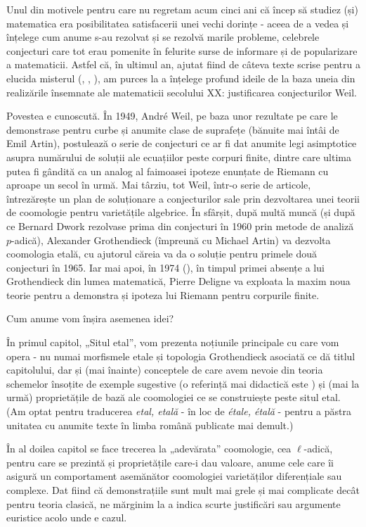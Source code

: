 \documentclass[13pt,openany,oneside]{book}
\begin{document}
Unul din motivele pentru care nu regretam acum cinci ani că încep să studiez (și) matematica era posibilitatea satisfacerii unei vechi dorințe - aceea de a vedea și înțelege cum anume s-au rezolvat și se rezolvă marile probleme, celebrele conjecturi care tot erau pomenite în felurite surse de informare și de popularizare a matematicii. Astfel că, în ultimul an, ajutat fiind de câteva texte scrise pentru a elucida misterul (\cite{milne}, \cite{lovering}, \cite{dugger}), am purces la a înțelege profund ideile de la baza uneia din realizările însemnate ale matematicii secolului XX: justificarea conjecturilor Weil.

Povestea e cunoscută. În 1949, André Weil, pe baza unor rezultate pe care le demonstrase pentru curbe și anumite clase de suprafețe (bănuite mai întâi de Emil Artin), postulează o serie de conjecturi ce ar fi dat anumite legi asimptotice asupra numărului de soluții ale ecuațiilor peste corpuri finite, dintre care ultima putea fi gândită ca un analog al faimoasei ipoteze enunțate de Riemann cu aproape un secol în urmă. Mai târziu, tot Weil, într-o serie de articole, întrezărește un plan de soluționare a conjecturilor sale prin dezvoltarea unei teorii de coomologie pentru varietățile algebrice. În sfârșit, după multă muncă (și după ce Bernard Dwork rezolvase prima din conjecturi în 1960 prin metode de analiză $p$-adică), Alexander Grothendieck (împreună cu Michael Artin) va dezvolta coomologia etală, cu ajutorul căreia va da o soluție pentru primele două conjecturi în 1965. Iar mai apoi, în 1974 (\cite{deligne}), în timpul primei absențe a lui Grothendieck din lumea matematică, Pierre Deligne va exploata la maxim noua teorie pentru a demonstra și ipoteza lui Riemann pentru corpurile finite.

Cum anume vom înșira asemenea idei? 

În primul capitol, „Situl etal”, vom prezenta noțiunile principale cu care vom opera - nu numai morfismele etale și topologia Grothendieck asociată ce dă titlul capitolului, dar și (mai înainte) conceptele de care avem nevoie din teoria schemelor însoțite de exemple sugestive (o referință mai didactică este \cite{vakil}) și (mai la urmă) proprietățile de bază ale coomologiei ce se construiește peste situl etal. (Am optat pentru traducerea {\it etal, etală} - în loc de {\it étale, étală} - pentru a păstra unitatea cu anumite texte în limba română publicate mai demult.)

În al doilea capitol se face trecerea la „adevărata” coomologie, cea $\ell$-adică, pentru care se prezintă și proprietățile care-i dau valoare, anume cele care îi asigură un comportament asemănător coomologiei varietăților diferențiale sau complexe. Dat fiind că demonstrațiile sunt mult mai grele și mai complicate decât pentru teoria clasică, ne mărginim la a indica scurte justificări sau argumente euristice acolo unde e cazul.
\end{document}
